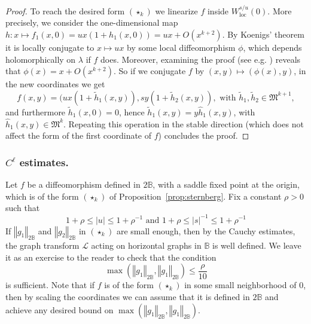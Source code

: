 \documentclass[11pt, oneside]{amsart}
\newcommand{\B}{\mathbb{B}}
\newcommand{\fkm}{\mathfrak{M}}
\newcommand{\norm}[1]{\left\Vert#1\right\Vert}
\newcommand{\abs}[1]{\left\vert#1\right\vert}
\newcommand{\unsur}[1]{\frac{1}{#1}}
\newcommand{\el}{\mathcal{L}}
\newcommand{\loc}{{\mathrm{loc}}}
\newcommand{\inv}{^{-1}}
\theoremstyle{remark}
\theoremstyle{definition}
\theoremstyle{theorem}
\newcommand{\commentaire}[1]{}
\begin{document}
\begin{proof}
To reach the desired form $(\star_k)$ we linearize $f$ inside $W^{s/u}_\loc(0)$. 
More precisely, we consider the one-dimensional map $h:x\mapsto f_1(x, 0) = ux(1+h_1(x,0)) = ux+ O(x^{k+2})$.  By   Koenigs' theorem it is locally conjugate to $x\mapsto ux$ by some 
 local diffeomorphism $\phi$, which depends holomorphically on $\lambda$ if $f$ does\commentaire{added comment on holomorphic variation}. Moreover, examining the proof (see e.g. \cite{milnor_book}) reveals that 
 $\phi(x)   = x+ O(x^{k+2})$. So if  we conjugate $f$ by $(x,y)\mapsto (\phi(x), y)$, in the new coordinates we get 
 \begin{equation}
f(x,y) =  (ux(1+\tilde h_1(x,y)), sy(1+\tilde h_2(x,y)), \text{ with } \tilde h_1,\tilde  h_2\in \fkm ^{k+1}, 
\end{equation}
 and furthermore $ \tilde h_1(x, 0) = 0$, hence $\tilde  h_1 (x,y) = y \hat h_1(x,y)$, with 
 $\hat h_1(x,y)\in \fkm^k$. 
 Repeating this operation in the stable direction (which does not affect the form 
 of the first coordinate of $f$) concludes the proof.
 \end{proof}


 
\subsubsection{$C^\ell$ estimates.}
 Let $f$ be a diffeomorphism defined in   $2 \B$, 
with a saddle fixed point at the origin, which is 
of the form  $(\star_k)$ of Proposition~\ref{prop:sternberg}. 
Fix a constant $\rho>0$ such that 
\begin{equation}\label{eq:rho}
1+\rho \leq \abs{u}\leq 1+\rho\inv \text{ and } 1+\rho \leq \abs{s}\inv\leq 1+\rho\inv 
\end{equation}
If $\norm{g_1}_{2  \B}$ and $\norm{g_2}_{2 \B}$ in $(\star_k)$ are small enough, then by the Cauchy estimates, the 
graph transform $\el$ acting on horizontal graphs in $\B$ is well defined. We leave it as an exercise to the reader to check that the condition  
\begin{equation}
\label{eq:maxg}
\max(\norm{g_1}_{2  \B},\norm{g_1}_{2  \B})\leq \frac{\rho}{10} 
\end{equation}
 is sufficient. 
 Note that if $f$ is of the form $(\star_k)$ in some small neighborhood of $0$, 
 then by scaling the coordinates 
we can assume that it is defined in $2\B$ and achieve any desired bound 
on $\max(\norm{g_1}_{2  \B},\norm{g_1}_{2  \B})$.
\end{document}
